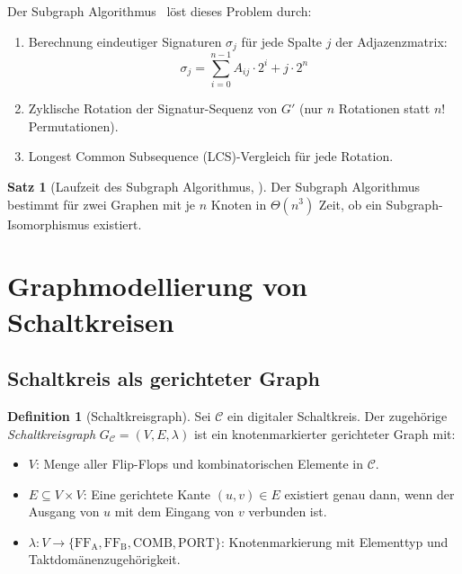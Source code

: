 ﻿\documentclass[a4paper,12pt]{article}
\theoremstyle{definition}
\newtheorem{definition}{Definition}
\newtheorem{satz}{Satz}
\begin{document}
	Der Subgraph Algorithmus~\cite{epp2026subgraph} l\"ost dieses Problem durch:
	\begin{enumerate}
		\item Berechnung eindeutiger Signaturen $\sigma_j$ f\"ur jede Spalte $j$ der
		Adjazenzmatrix:
		\[
		\sigma_j = \sum_{i=0}^{n-1} A_{ij} \cdot 2^i + j \cdot 2^n
		\]
		\item Zyklische Rotation der Signatur-Sequenz von $G'$ (nur $n$ Rotationen
		statt $n!$ Permutationen).
		\item Longest Common Subsequence (LCS)-Vergleich f\"ur jede Rotation.
	\end{enumerate}
	
	\begin{satz}[Laufzeit des Subgraph Algorithmus, \cite{epp2026subgraph}]
		\label{satz:subgraph_laufzeit}
		Der Subgraph Algorithmus bestimmt f\"ur zwei Graphen mit je $n$ Knoten in
		$\Theta(n^3)$ Zeit, ob ein Subgraph-Isomorphismus existiert.
	\end{satz}
	
	\section{Graphmodellierung von Schaltkreisen}
	
	\subsection{Schaltkreis als gerichteter Graph}
	
	\begin{definition}[Schaltkreisgraph]
		\label{def:schaltkreisgraph}
		Sei $\mathcal{C}$ ein digitaler Schaltkreis. Der zugeh\"orige
		\emph{Schaltkreisgraph} $G_{\mathcal{C}} = (V, E, \lambda)$ ist ein
		knotenmarkierter gerichteter Graph mit:
		\begin{itemize}
			\item $V$: Menge aller Flip-Flops und kombinatorischen Elemente in $\mathcal{C}$.
			\item $E \subseteq V \times V$: Eine gerichtete Kante $(u, v) \in E$ existiert
			genau dann, wenn der Ausgang von $u$ mit dem Eingang von $v$ verbunden ist.
			\item $\lambda: V \to \{\mathrm{FF}_{\mathrm{A}}, \mathrm{FF}_{\mathrm{B}},
			\mathrm{COMB}, \mathrm{PORT}\}$: Knotenmarkierung mit Elementtyp und
			Taktdom\"anenzugeh\"origkeit.
		\end{itemize}
	\end{definition}
	
\end{document}
